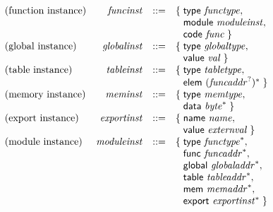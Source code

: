 $$
\begin{array}{@{}lrrl@{}l@{}}
\mbox{(function instance)} & {\mathit{funcinst}} &::=& \{\; \begin{array}[t]{@{}l@{}l@{}}
\mathsf{type}~{\mathit{functype}},\; \\
  \mathsf{module}~{\mathit{moduleinst}},\; \\
  \mathsf{code}~{\mathit{func}} \;\}\end{array} \\
\mbox{(global instance)} & {\mathit{globalinst}} &::=& \{\; \begin{array}[t]{@{}l@{}l@{}}
\mathsf{type}~{\mathit{globaltype}},\; \\
  \mathsf{value}~{\mathit{val}} \;\}\end{array} \\
\mbox{(table instance)} & {\mathit{tableinst}} &::=& \{\; \begin{array}[t]{@{}l@{}l@{}}
\mathsf{type}~{\mathit{tabletype}},\; \\
  \mathsf{elem}~{({{\mathit{funcaddr}}^?})^\ast} \;\}\end{array} \\
\mbox{(memory instance)} & {\mathit{meminst}} &::=& \{\; \begin{array}[t]{@{}l@{}l@{}}
\mathsf{type}~{\mathit{memtype}},\; \\
  \mathsf{data}~{{\mathit{byte}}^\ast} \;\}\end{array} \\
\mbox{(export instance)} & {\mathit{exportinst}} &::=& \{\; \begin{array}[t]{@{}l@{}l@{}}
\mathsf{name}~{\mathit{name}},\; \\
  \mathsf{value}~{\mathit{externval}} \;\}\end{array} \\
\mbox{(module instance)} & {\mathit{moduleinst}} &::=& \{\; \begin{array}[t]{@{}l@{}l@{}}
\mathsf{type}~{{\mathit{functype}}^\ast},\; \\
  \mathsf{func}~{{\mathit{funcaddr}}^\ast},\; \\
  \mathsf{global}~{{\mathit{globaladdr}}^\ast},\; \\
  \mathsf{table}~{{\mathit{tableaddr}}^\ast},\; \\
  \mathsf{mem}~{{\mathit{memaddr}}^\ast},\; \\
  \mathsf{export}~{{\mathit{exportinst}}^\ast} \;\}\end{array} \\
\end{array}
$$

